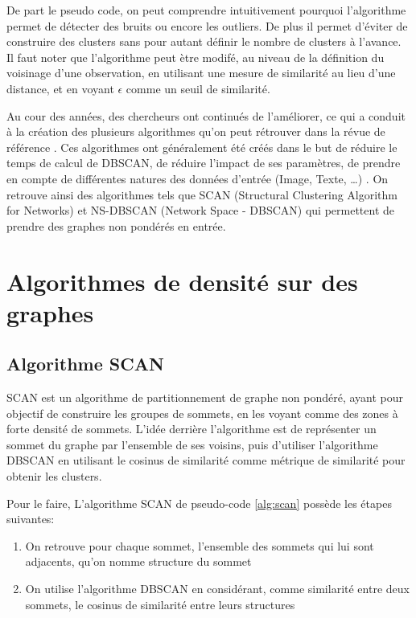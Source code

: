 \documentclass[12pt, french, latin.medieval, a4paper]{report}
\begin{document}
   		 De part le pseudo code, on peut comprendre intuitivement pourquoi l'algorithme permet de détecter des bruits ou encore les outliers.
   		 De plus il permet d'éviter de construire des clusters sans pour autant définir le nombre de clusters à l'avance.
   		 Il faut noter que l'algorithme peut ètre modifé, au niveau de la définition du voisinage d'une observation, en utilisant une mesure de similarité au lieu d'une distance, et en voyant $\epsilon$ comme un seuil de similarité.
   		 
   		 Au cour des années, des chercheurs ont continués de l'améliorer, ce qui a conduit à la création des plusieurs algorithmes qu'on peut rétrouver dans la révue de référence \cite{bhattacharjee2021survey}.
   		 Ces algorithmes ont généralement été créés dans le but de réduire le temps de calcul de DBSCAN, de réduire l'impact de ses paramètres, de prendre en compte de différentes natures des données d'entrée (Image, Texte, \dots) .  
   		 On retrouve ainsi des algorithmes tels que SCAN (Structural Clustering Algorithm for Networks) et NS-DBSCAN (Network Space - DBSCAN) qui permettent de prendre des graphes
   		 non pondérés en entrée.
   		 
    \section{Algorithmes de densité sur des graphes}

   	 \subsection{Algorithme SCAN}
   		 SCAN \cite{xu2007scan} est un algorithme de partitionnement de graphe non pondéré, ayant pour objectif de construire les groupes de sommets, en les voyant comme des zones à forte densité de sommets.
   		 L'idée derrière l'algorithme est de représenter un sommet du graphe par l'ensemble de ses voisins, puis d'utiliser l'algorithme DBSCAN en utilisant le cosinus de similarité comme métrique de similarité pour obtenir les clusters.

   		 Pour le faire, L'algorithme SCAN de pseudo-code \ref{alg:scan} possède les étapes suivantes:
   		 \begin{enumerate}
   			 \item On retrouve pour chaque sommet, l'ensemble des sommets qui lui sont adjacents, qu'on nomme structure du sommet
   			 \item On utilise l'algorithme DBSCAN en considérant, comme similarité entre deux sommets, le cosinus de similarité entre leurs structures
   		 \end{enumerate}
\end{document}
